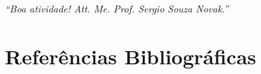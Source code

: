 \documentclass[12pt,a4paper]{report}
\begin{document}
\vspace{0.8cm}

\begin{center}
  \textit{``Boa atividade! Att. Me. Prof. Sergio Souza Novak.''}
\end{center}

\chapter*{Referências Bibliográficas}
\printbibliography[heading=none]
\end{document}
